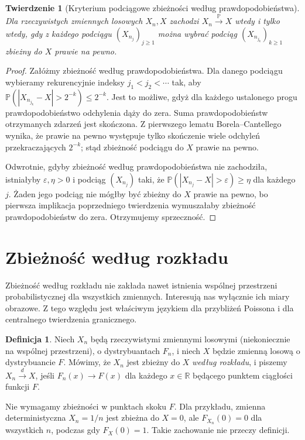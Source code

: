 \documentclass[11pt,a4paper,oneside]{report}
\numberwithin{equation}{chapter}
\theoremstyle{plain}
\newtheorem{twierdzenie}{Twierdzenie}[chapter]
\theoremstyle{definition}
\newtheorem{definicja}{Definicja}[chapter]
\theoremstyle{remark}
\newcommand{\R}{\mathbb{R}}
\newcommand{\Prob}{\mathbb{P}}
\begin{document}
\begin{twierdzenie}[Kryterium podciągowe zbieżności według prawdopodobieństwa]
Dla rzeczywistych zmiennych losowych $X_n,X$ zachodzi
$X_n\xrightarrow{\Prob}X$ wtedy i tylko wtedy, gdy
z każdego podciągu $(X_{n_j})_{j\geq1}$ można wybrać
podciąg $(X_{n_{j_k}})_{k\geq1}$ zbieżny do $X$
prawie na pewno.
\end{twierdzenie}
\begin{proof}
Załóżmy zbieżność według prawdopodobieństwa.
Dla danego podciągu wybieramy rekurencyjnie indeksy
$j_1<j_2<\cdots$ tak, aby
$\Prob(|X_{n_{j_k}}-X|>2^{-k})\leq2^{-k}$.
Jest to możliwe, gdyż dla każdego ustalonego progu
prawdopodobieństwo odchylenia dąży do zera.
Suma prawdopodobieństw otrzymanych zdarzeń jest skończona.
Z pierwszego lematu Borela--Cantellego wynika, że
prawie na pewno występuje tylko skończenie wiele
odchyleń przekraczających $2^{-k}$; stąd zbieżność
podciągu do $X$ prawie na pewno.

Odwrotnie, gdyby zbieżność według prawdopodobieństwa
nie zachodziła, istniałyby $\varepsilon,\eta>0$ i
podciąg $(X_{n_j})$ taki, że
$\Prob(|X_{n_j}-X|>\varepsilon)\geq\eta$
dla każdego $j$. Żaden jego podciąg nie mógłby być
zbieżny do $X$ prawie na pewno, bo pierwsza implikacja
poprzedniego twierdzenia wymuszałaby zbieżność
prawdopodobieństw do zera. Otrzymujemy sprzeczność.
\end{proof}

\section{Zbieżność według rozkładu}

Zbieżność według rozkładu nie zakłada nawet istnienia
wspólnej przestrzeni probabilistycznej dla wszystkich
zmiennych. Interesują nas wyłącznie ich miary obrazowe.
Z tego względu jest właściwym językiem dla
przybliżeń Poissona i dla centralnego twierdzenia granicznego.

\begin{definicja}
Niech $X_n$ będą rzeczywistymi zmiennymi losowymi
(niekoniecznie na wspólnej przestrzeni), o dystrybuantach
$F_n$, i niech $X$ będzie zmienną losową o dystrybuancie
$F$. Mówimy, że $X_n$ jest zbieżny do $X$
\emph{według rozkładu}, i piszemy $X_n\xrightarrow{d}X$,
jeśli $F_n(x)\to F(x)$ dla każdego $x\in\R$ będącego
punktem ciągłości funkcji $F$.
\end{definicja}

Nie wymagamy zbieżności w punktach skoku $F$.
Dla przykładu, zmienna deterministyczna $X_n=1/n$
jest zbieżna do $X=0$, ale $F_{X_n}(0)=0$ dla
wszystkich $n$, podczas gdy $F_X(0)=1$.
Takie zachowanie nie przeczy definicji.
\end{document}
